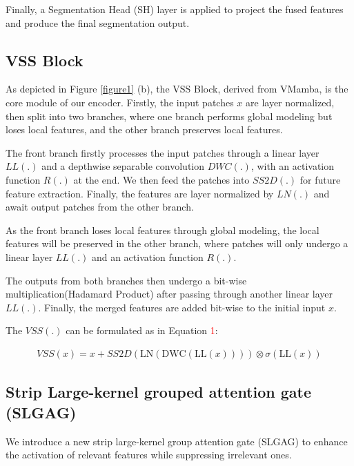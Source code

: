 \documentclass[letterpaper, 10 pt, conference]{ieeeconf}  %
\begin{document}
Finally, a Segmentation Head (SH) layer is applied to project the fused features and produce the final segmentation output.

\subsection{VSS Block}

As depicted in Figure \textcolor{red}{\ref{figure1}} (b), the VSS Block, derived from VMamba\cite{zhu2024vim,liu2024vmamba}, is the core module of our encoder. Firstly, the input patches $x$ are layer normalized, then split into two branches, where one branch performs global modeling but loses local features, and the other branch preserves local features.

The front branch firstly processes the input patches through a linear layer $LL(.)$ and a depthwise separable convolution $DWC(.)$, with an activation function $R(.)$ at the end. We then feed the patches into $SS2D(.)$ for future feature extraction. Finally, the features are layer normalized by $LN(.)$ and await output patches from the other branch.

As the front branch loses local features through global modeling, the local features will be preserved in the other branch, where patches will only undergo a linear layer $LL(.)$ and an activation function $R(.)$.

The outputs from both branches then undergo a bit-wise multiplication(Hadamard Product) after passing through another linear layer $LL(.)$. Finally, the merged features are added bit-wise to the initial input $x$.

The $VSS(.)$ can be formulated as in Equation \textcolor{red}{1}:
\begin{scriptsize} 
\begin{align} 
  VSS(x) = x + SS2D\left(\text{LN}\left(\text{DWC}\left(\text{LL}(x)\right)\right)\right) \otimes \sigma\left(\text{LL}(x)\right)
\end{align} 
\end{scriptsize}



\subsection{Strip Large-kernel grouped attention gate (SLGAG)}

We introduce a new strip large-kernel group attention gate (SLGAG) to enhance the activation of relevant features while suppressing irrelevant ones. 
\end{document}
